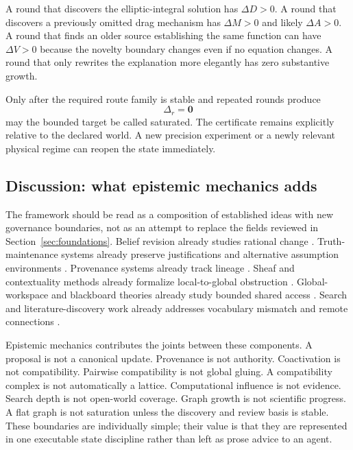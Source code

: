 A round that discovers the elliptic-integral solution has \(\Delta D>0\). A round that discovers a previously omitted drag mechanism has \(\Delta M>0\) and likely \(\Delta A>0\). A round that finds an older source establishing the same function can have \(\Delta V>0\) because the novelty boundary changes even if no equation changes. A round that only rewrites the explanation more elegantly has zero substantive growth.

Only after the required route family is stable and repeated rounds produce
\[
\Delta_r=\mathbf0
\]
may the bounded target be called saturated. The certificate remains explicitly relative to the declared world. A new precision experiment or a newly relevant physical regime can reopen the state immediately.

\subsection{Discussion: what epistemic mechanics adds}

The framework should be read as a composition of established ideas with new governance boundaries, not as an attempt to replace the fields reviewed in Section~\ref{sec:foundations}. Belief revision already studies rational change \cite{agm1985,gardenfors1988}. Truth-maintenance systems already preserve justifications and alternative assumption environments \cite{doyle1979,dekleer1986}. Provenance systems already track lineage \cite{buneman2001,green2007,prov2013}. Sheaf and contextuality methods already formalize local-to-global obstruction \cite{abramsky2011,curry2014}. Global-workspace and blackboard theories already study bounded shared access \cite{hayesroth1985,nii1986,baars1988,dehaene2001}. Search and literature-discovery work already addresses vocabulary mismatch and remote connections \cite{furnas1987,swanson1986,garikaparthi2025}.

Epistemic mechanics contributes the joints between these components. A proposal is not a canonical update. Provenance is not authority. Coactivation is not compatibility. Pairwise compatibility is not global gluing. A compatibility complex is not automatically a lattice. Computational influence is not evidence. Search depth is not open-world coverage. Graph growth is not scientific progress. A flat graph is not saturation unless the discovery and review basis is stable. These boundaries are individually simple; their value is that they are represented in one executable state discipline rather than left as prose advice to an agent.

